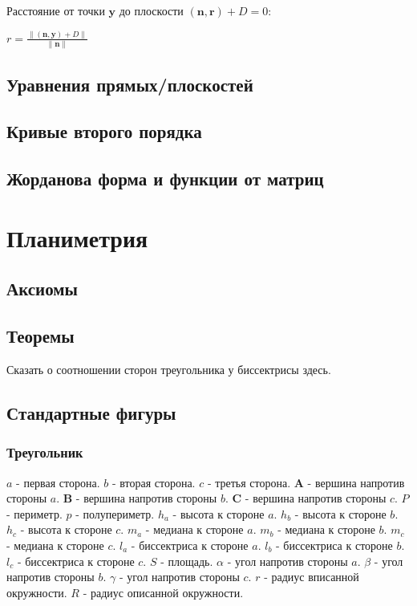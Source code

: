 Расстояние от точки $\boldsymbol{y}$ до плоскости $ (\boldsymbol{n}, \boldsymbol{r}) + D = 0 $:

$\displaystyle r = \frac{\|(\boldsymbol{n}, \boldsymbol{y}) + D\|}{\|\boldsymbol{n}\|} $

\subsection{Уравнения прямых/плоскостей}

\subsection{Кривые второго порядка}

\subsection{Жорданова форма и функции от матриц}


\section{Планиметрия}

\subsection{Аксиомы}

\subsection{Теоремы}

Сказать о соотношении сторон треугольника у биссектрисы здесь.

\subsection{Стандартные фигуры}

\subsubsection{Треугольник}

$a$ - первая сторона.
$b$ - вторая сторона.
$c$ - третья сторона.
$\boldsymbol{A}$ - вершина напротив стороны $a$.
$\boldsymbol{B}$ - вершина напротив стороны $b$.
$\boldsymbol{C}$ - вершина напротив стороны $c$.
$P$ - периметр.
$p$ - полупериметр.
$h_a$ - высота к стороне $a$.
$h_b$ - высота к стороне $b$.
$h_c$ - высота к стороне $c$.
$m_a$ - медиана к стороне $a$.
$m_b$ - медиана к стороне $b$.
$m_c$ - медиана к стороне $c$.
$l_a$ - биссектриса к стороне $a$.
$l_b$ - биссектриса к стороне $b$.
$l_c$ - биссектриса к стороне $c$.
$S$ - площадь.
$\alpha$ - угол напротив стороны $a$.
$\beta$ - угол напротив стороны $b$.
$\gamma$ - угол напротив стороны $c$.
$r$ - радиус вписанной окружности.
$R$ - радиус описанной окружности.

